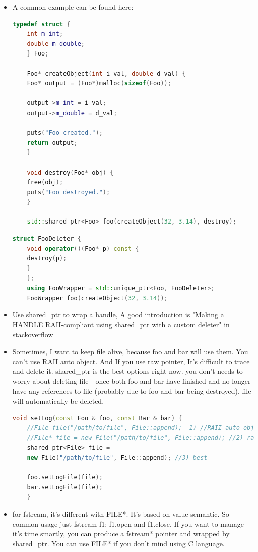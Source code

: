 \documentclass[a4paper,12pt,twoside]{book}
\begin{document}
\begin{itemize}
	\item A common example can be found here:
	\begin{lstlisting}[frame=single, language=c++]
	typedef struct {
	int m_int;
	double m_double;
	} Foo;
	
	Foo* createObject(int i_val, double d_val) {
	Foo* output = (Foo*)malloc(sizeof(Foo));
	
	output->m_int = i_val;
	output->m_double = d_val;
	
	puts("Foo created.");
	return output;
	}
	
	void destroy(Foo* obj) {
	free(obj);
	puts("Foo destroyed.");        
	}
	
	std::shared_ptr<Foo> foo(createObject(32, 3.14), destroy);
	\end{lstlisting}
	
	\begin{lstlisting}[frame=single, language=c++]
	struct FooDeleter {
	void operator()(Foo* p) const {
	destroy(p);
	}
	};
	using FooWrapper = std::unique_ptr<Foo, FooDeleter>;
	FooWrapper foo(createObject(32, 3.14));
	\end{lstlisting}
	
	\item Use shared\_ptr to wrap a handle, A good introduction is "Making a HANDLE RAII-compliant using shared\_ptr with a custom deleter" in stackoverflow
	
	
	\item Sometimes, I want to keep file alive, because foo and bar will use them. You can't use RAII auto object. And If you use raw pointer, It's difficult to trace and delete it. shared\_ptr is the best options right now.  you don't needs to worry about deleting file - once both foo and bar have finished and no longer have any references to file (probably due to foo and bar being destroyed), file will automatically be deleted.
	
	\begin{lstlisting}[frame=single, language=c++]
	void setLog(const Foo & foo, const Bar & bar) {
	//File file("/path/to/file", File::append);  1) //RAII auto obj
	//File* file = new File("/path/to/file", File::append); //2) raw new
	shared_ptr<File> file =
	new File("/path/to/file", File::append); //3) best
	
	foo.setLogFile(file);
	bar.setLogFile(file);
	}
	\end{lstlisting}
	
	\item for fstream, it's different with FILE*. It's based on value semantic. So common usage just fstream f1; f1.open and f1.close. If you want to manage it's time smartly, you can produce a fstream* pointer and wrapped by shared\_ptr. You can use FILE* if you don't mind using C language.
	

\end{itemize}
\end{document}
